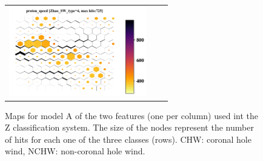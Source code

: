 \documentclass[utf8]{frontiersSCNS} %
\begin{document}
\begin{figure}[h!]
\begin{tabular}{m{1cm}CC}
		\includegraphics[width=6cm]{Amaya/SWtype-Zhao_SW_type-4-proton_speed}\hfill \\
	\end{tabular}
	\caption{Maps for model A of the two features (one per column) used int the Z classification system. The size of the nodes represent the number of hits for each one of the three classes (rows). CHW: coronal hole wind, NCHW: non-coronal hole wind.}\label{fig:SWtypeZ}
\end{figure}
\end{document}
